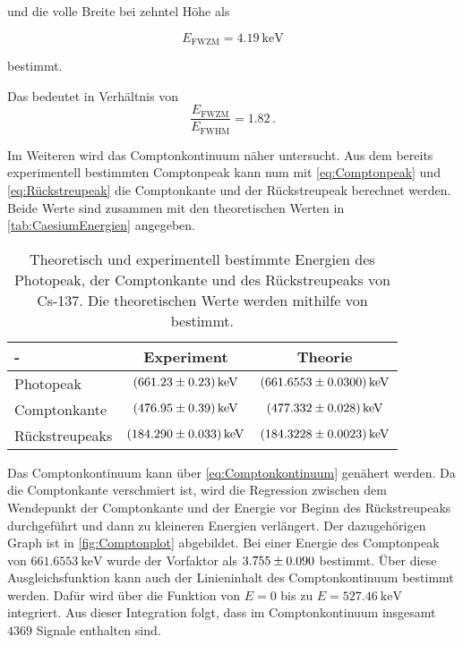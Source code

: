 und die volle Breite bei zehntel Höhe als

\begin{equation*}
    E_{\text{FWZM}} =  \SI{4.19}{\kilo\eV}
\end{equation*}

bestimmt. 

Das bedeutet in Verhältnis von 
\begin{equation*}
    \frac{E_{\text{FWZM}}}{E_{\text{FWHM}}} = 1.82\,.
\end{equation*}

Im Weiteren wird das Comptonkontinuum näher untersucht.
Aus dem bereits experimentell bestimmten Comptonpeak kann num mit \autoref{eq:Comptonpeak} und \autoref{eq:Rückstreupeak} %
 die Comptonkante und der Rückstreupeak berechnet werden.
Beide Werte sind zusammen mit den theoretischen Werten in \autoref{tab:CaesiumEnergien} angegeben.

\begin{table}
    \centering
    \caption{Theoretisch und experimentell bestimmte Energien des Photopeak, der Comptonkante und des Rückstreupeaks von Cs-137. Die theoretischen Werte werden mithilfe von \cite{LNHB} bestimmt.}
    \label{tab:CaesiumEnergien}
    \begin{tabular}{l S[table-format=3.2(4), separate-uncertainty] S[table-format=3.4(4), separate-uncertainty]}
        \toprule
        {-} & {Experiment} & {Theorie}\\
        \midrule 
        Photopeak       & $\SI{661.23 \pm 0.23 }{\kilo\eV}$ & $\SI{661.6553 \pm 0.030}{\kilo\eV}$  \\ 
        Comptonkante    & $\SI{476.95 \pm 0.39 }{\kilo\eV}$ & $\SI{477.332 \pm 0.028}{\kilo\eV}$    \\ 
        Rückstreupeaks  & $\SI{184.290 \pm 0.033 }{\kilo\eV}$ & $\SI{184.3228 \pm 0.0023}{\kilo\eV}$  \\ 
        \bottomrule
    \end{tabular}
\end{table}

Das Comptonkontinuum kann über \autoref{eq:Comptonkontinuum} %
genähert werden. 
Da die Comptonkante verschmiert ist, wird die Regression zwischen dem Wendepunkt der Comptonkante und der Energie vor Beginn des Rückstreupeaks durchgeführt und dann zu kleineren Energien verlängert.
Der dazugehörigen Graph ist in \autoref{fig:Comptonplot} abgebildet. 
Bei einer Energie des Comptonpeak von $\SI{661.6553}{\kilo\eV}$ wurde der Vorfaktor als $\num{3.755 \pm 0.090}$ bestimmt.
Über diese Ausgleichsfunktion kann auch der Linieninhalt des Comptonkontinuum bestimmt werden.
Dafür wird über die Funktion von $E = 0$ bis zu $E = \SI{527.46}{\kilo\eV}$ integriert.
Aus dieser Integration folgt, dass im Comptonkontinuum insgesamt $\num{4369}$ Signale enthalten sind.\\ 

